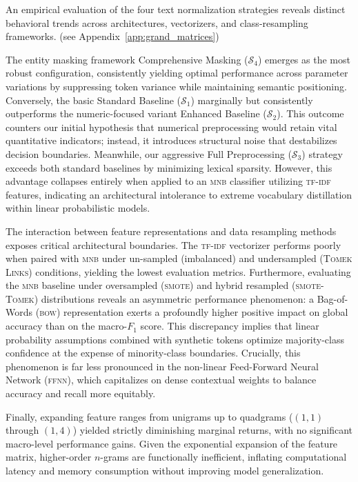 \documentclass[manuscript,screen,review, nonacm]{acmart}
\begin{document}
An empirical evaluation of the four text normalization strategies reveals distinct behavioral trends across architectures, vectorizers, and class-resampling frameworks. (see Appendix~\ref{app:grand_matrices})

The entity masking framework Comprehensive Masking ($\mathcal{S}_4$) emerges as the most robust configuration, consistently yielding optimal performance across parameter variations by suppressing token variance while maintaining semantic positioning. Conversely, the basic Standard Baseline ($\mathcal{S}_1$) marginally but consistently outperforms the numeric-focused variant Enhanced Baseline ($\mathcal{S}_2$). This outcome counters our initial hypothesis that numerical preprocessing would retain vital quantitative indicators; instead, it introduces structural noise that destabilizes decision boundaries. Meanwhile, our aggressive Full Preprocessing ($\mathcal{S}_3$) strategy exceeds both standard baselines by minimizing lexical sparsity. However, this advantage collapses entirely when applied to an \textsc{mnb} classifier utilizing \textsc{tf-idf} features, indicating an architectural intolerance to extreme vocabulary distillation within linear probabilistic models.

The interaction between feature representations and data resampling methods exposes critical architectural boundaries. The \textsc{tf-idf} vectorizer performs poorly when paired with \textsc{mnb} under un-sampled (imbalanced) and undersampled (\textsc{Tomek Links}) conditions, yielding the lowest evaluation metrics. Furthermore, evaluating the \textsc{mnb} baseline under oversampled (\textsc{smote}) and hybrid resampled (\textsc{smote}-\textsc{Tomek}) distributions reveals an asymmetric performance phenomenon: a Bag-of-Words (\textsc{bow}) representation exerts a profoundly higher positive impact on global accuracy than on the macro-$F_1$ score. This discrepancy implies that linear probability assumptions combined with synthetic tokens optimize majority-class confidence at the expense of minority-class boundaries. Crucially, this phenomenon is far less pronounced in the non-linear Feed-Forward Neural Network (\textsc{ffnn}), which capitalizes on dense contextual weights to balance accuracy and recall more equitably.

Finally, expanding feature ranges from unigrams up to quadgrams ($(1, 1)$ through $(1, 4)$) yielded strictly diminishing marginal returns, with no significant macro-level performance gains. Given the exponential expansion of the feature matrix, higher-order $n$-grams are functionally inefficient, inflating computational latency and memory consumption without improving model generalization.
\end{document}
